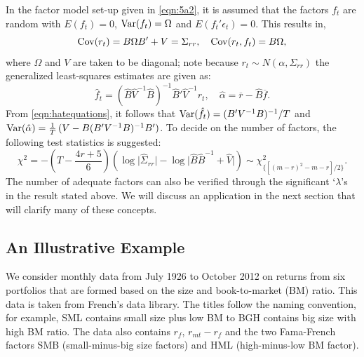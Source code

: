 	
In the factor model set-up given in \eqref{eqn:5a2}, it is assumed that the factors $f_t$ are random with $E(f_t)= 0$, $\operatorname{Var}(f_t)= \Omega$ and $E(f_t' \epsilon_t)= 0$. This results in,
	\begin{equation} \label{eqn:covdouble}
	\cov(r_t)= B \Omega B' + V = \Sigma_{rr}, \quad \cov(r_t,f_t)= B \Omega,
	\end{equation}
where $\Omega$ and $V$ are taken to be diagonal; note because $r_t \sim N(\alpha,\Sigma_{rr})$ the generalized least-squares estimates are given as:
	\begin{equation} \label{eqn:hatequations}
	\hat{f}_t= (\hat{B} \hat{V}^{-1} \hat{B})^{-1} \hat{B}' \hat{V}^{-1} r_t, \quad \hat{\alpha}= \overline{r} - \hat{B} \overline{f}.
	\end{equation}	
From \eqref{eqn:hatequations}, it follows that $\operatorname{Var}(\hat{f}_t)= (B' V^{-1} B)^{-1}/T$ and $\operatorname{Var}(\hat{\alpha})= \frac{1}{T} \, (V - B(B' V^{-1}B)^{-1}B')$. To decide on the number of factors, the following test statistics is suggested:
	\begin{equation} \label{eqn:5chi}
	\chi^2= -\left(T- \frac{4r+5}{6} \right) \left(\log \lvert\hat{\Sigma}_{rr}\rvert - \log \lvert\hat{B}\hat{B}^{-1} + \hat{V}\rvert \right)  \sim \chi^2_{\{[(m-r)^2-m-r]/2\}}.
	\end{equation}	
The number of adequate factors can also be verified through the significant `$\lambda$'s in the result stated above. We will discuss an application in the next section that will clarify many of these concepts. 
	


\subsection{An Illustrative Example}

We consider monthly data from July 1926 to October 2012 on returns from six portfolios that are formed based on the size and book-to-market (BM) ratio. This data is taken from French's data library. The titles follow the naming convention, for example, SML contains small size plus low BM to BGH contains big size with high BM ratio. The data also contains $r_f$, $r_{mt} -  r_f$ and the two Fama-French factors SMB (small-minus-big size factors) and HML (high-minus-low BM factor).

